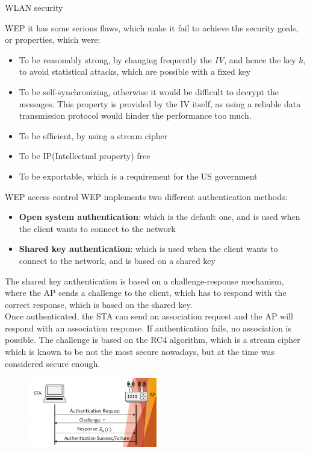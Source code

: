 \begin{section}{WLAN security}
\begin{subsection}{WEP}
    it has some serious flaws, which make it fail to achieve the security goals, or properties, 
    which were:
    \begin{itemize}
      \item To be reasonably strong, by changing frequently the \textit{IV}, and hence the key $k$,
        to avoid statistical attacks, which are possible with a fixed key
      \item To be self-synchronizing, otherwise it would be difficult to decrypt the messages.
        This property is provided by the IV itself, as using a reliable data transmission protocol
        would hinder the performance too much.
      \item To be efficient, by using a stream cipher
      \item To be IP(Intellectual property) free
      \item To be exportable, which is a requirement for the US government
    \end{itemize}
    \begin{subsubsection}{WEP access control}
      WEP implements two different authentication methods:
      \begin{itemize}
        \item \textbf{Open system authentication}: which is the default one, and is used when the 
          client wants to connect to the network
        \item \textbf{Shared key authentication}: which is used when the client wants to connect to the 
          network, and is based on a shared key
      \end{itemize}
      The shared key authentication is based on a challenge-response mechanism, where the AP sends a
      challenge to the client, which has to respond with the correct response, which is based on the
      shared key.\\
      Once authenticated, the STA can send an association request and the AP will respond with an 
      association response. If authentication fails, no association is possible.
      The challenge is based on the RC4 algorithm, which is a stream cipher which is known to be not 
      the most secure nowadays, but at the time was considered secure enough.\\
      \begin{figure}[h]
        \centering
        \includegraphics[width=0.5\textwidth]{img/wireless/WEP authentication.png}

\end{figure}
\end{subsubsection}
\end{subsection}
\end{section}
